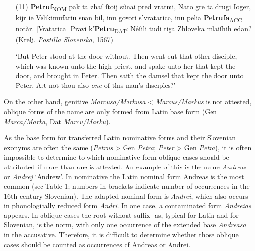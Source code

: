 \documentclass[output=paper,colorlinks,citecolor=brown,arabicfont,chinesefont]{langscibook}
\begin{document}
\begin{itemize}
    \item[(11)] \textbf{Petruſ}\textsubscript{NOM} pak ta zhaſ ſtoij sûnai pred vratmi, Nato gre ta drugi Ioger, kijr ie Velikimufariu snan bil, inu govori s'vratarico, inu pelia \textbf{Petruſa}\textsubscript{ACC} notàr. [Vratarica] Pravi k'\textbf{Petru}\textsubscript{DAT}: Néſili tudi tiga Zhloveka mlaiſhih edan? (Krelj, \emph{Postilla Slovenska}, 1567)
    
    ‘But Peter stood at the door without. Then went out that other disciple, which was known unto the high priest, and spake unto her that kept the door, and brought in Peter. Then saith the damsel that kept the door unto Peter, Art not thou also \emph{one} of this man's disciples?’
\end{itemize}

On the other hand, genitive \emph{Marcusa/Markusa} < \emph{Marcus/Markus} is not attested, oblique forms of the name are only formed from Latin base form (Gen \emph{Marca/Marka}, Dat \emph{Marcu/Marku}). 

As the base form for transferred Latin nominative forms and their Slovenian exonyms are often the same (\emph{Petrus} > Gen \emph{Petra}; \emph{Peter} > Gen \emph{Petra}), it is often impossible to determine  to which nominative form oblique cases should be attributed if more than one is attested. An example of this is the name \emph{Andreas} or \emph{Andrej} ‘Andrew’. In nominative the Latin nominal form Andreas is the most common (see Table 1; numbers in brackets indicate number of occurrences in the 16th-century Slovenian). The adapted nominal form is \emph{Andrei}, which also occurs in phonologically reduced form \emph{Andri}. In one case, a contaminated form \emph{Andreias} appears. In oblique cases the root without suffix -as, typical for Latin and for Slovenian, is the norm, with only one occurrence of the extended base \emph{Andreasa} in the accusative. Therefore, it is difficult to determine whether those oblique cases should be counted as occurrences of Andreas or Andrei.
\end{document}
